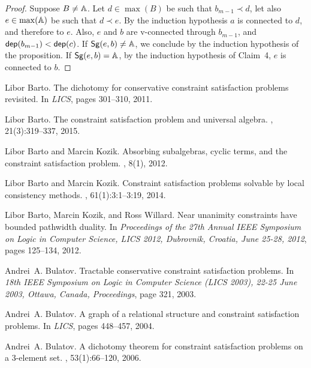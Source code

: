 \documentclass[11pt]{article}
\begin{document}
\begin{proof}
Suppose $B\ne{\mathbb A}$. Let $d\in\max(B)$ be such that $b_{m-1}\prec d$, let also 
$e\in\max({\mathbb A})$ be such that $d\prec e$. By the induction hypothesis $a$ is connected 
to $d$, and therefore to $e$. Also, $e$ and $b$ are v-connected through $b_{m-1}$, 
and $\mathsf{dep}(b_{m-1})<\mathsf{dep}(c)$. If ${\sf Sg}(e,b)\ne{\mathbb A}$, we conclude by the induction 
hypothesis of the proposition. If ${\sf Sg}(e,b)={\mathbb A}$, by the induction hypothesis of 
Claim~4, $e$ is connected to $b$.
\end{proof}


\begin{thebibliography}{10}

Libor Barto.
\newblock The dichotomy for conservative constraint satisfaction problems
  revisited.
\newblock In {\em {LICS}}, pages 301--310, 2011.

Libor Barto.
\newblock The constraint satisfaction problem and universal algebra.
, 21(3):319--337, 2015.

Libor Barto and Marcin Kozik.
\newblock Absorbing subalgebras, cyclic terms, and the constraint satisfaction
  problem.
, 8(1), 2012.

Libor Barto and Marcin Kozik.
\newblock Constraint satisfaction problems solvable by local consistency
  methods.
, 61(1):3:1--3:19, 2014.

Libor Barto, Marcin Kozik, and Ross Willard.
\newblock Near unanimity constraints have bounded pathwidth duality.
\newblock In {\em Proceedings of the 27th Annual {IEEE} Symposium on Logic in
  Computer Science, {LICS} 2012, Dubrovnik, Croatia, June 25-28, 2012}, pages
  125--134, 2012.

Andrei~A. Bulatov.
\newblock Tractable conservative constraint satisfaction problems.
\newblock In {\em 18th {IEEE} Symposium on Logic in Computer Science {(LICS}
  2003), 22-25 June 2003, Ottawa, Canada, Proceedings}, page 321, 2003.

Andrei~A. Bulatov.
\newblock A graph of a relational structure and constraint satisfaction
  problems.
\newblock In {\em {LICS}}, pages 448--457, 2004.

Andrei~A. Bulatov.
\newblock A dichotomy theorem for constraint satisfaction problems on a
  3-element set.
, 53(1):66--120, 2006.


\end{thebibliography}
\end{document}
